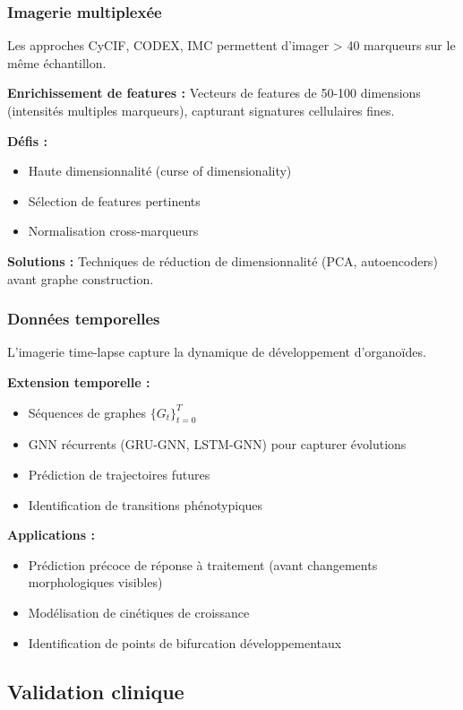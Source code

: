 \subsubsection{Imagerie multiplexée}

Les approches CyCIF, CODEX, IMC permettent d'imager > 40 marqueurs sur le même échantillon.

\textbf{Enrichissement de features :}
Vecteurs de features de 50-100 dimensions (intensités multiples marqueurs), capturant signatures cellulaires fines.

\textbf{Défis :}
\begin{itemize}
    \item Haute dimensionnalité (curse of dimensionality)
    \item Sélection de features pertinents
    \item Normalisation cross-marqueurs
\end{itemize}

\textbf{Solutions :}
Techniques de réduction de dimensionnalité (PCA, autoencoders) avant graphe construction.

\subsubsection{Données temporelles}

L'imagerie time-lapse capture la dynamique de développement d'organoïdes.

\textbf{Extension temporelle :}
\begin{itemize}
    \item Séquences de graphes $\{G_t\}_{t=0}^T$
    \item GNN récurrents (GRU-GNN, LSTM-GNN) pour capturer évolutions
    \item Prédiction de trajectoires futures
    \item Identification de transitions phénotypiques
\end{itemize}

\textbf{Applications :}
\begin{itemize}
    \item Prédiction précoce de réponse à traitement (avant changements morphologiques visibles)
    \item Modélisation de cinétiques de croissance
    \item Identification de points de bifurcation développementaux
\end{itemize}

\subsection{Validation clinique}

